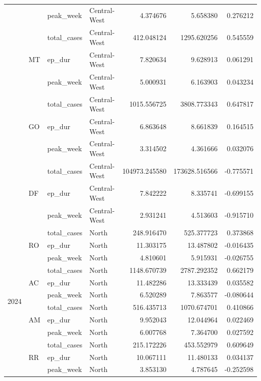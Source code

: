 \documentclass{report}
\begin{document}
\begin{center}
\begin{center}
\begin{longtable}{llllrrr}
 &  & peak\_week & Central-West & 4.374676 & 5.658380 & 0.276212 \\
\cline{2-7}
 & \multirow[t]{3}{*}{MT} & total\_cases & Central-West & 412.048124 & 1295.620256 & 0.545559 \\
 &  & ep\_dur & Central-West & 7.820634 & 9.628913 & 0.061291 \\
 &  & peak\_week & Central-West & 5.000931 & 6.163903 & 0.043234 \\
\cline{2-7}
 & \multirow[t]{3}{*}{GO} & total\_cases & Central-West & 1015.556725 & 3808.773343 & 0.647817 \\
 &  & ep\_dur & Central-West & 6.863648 & 8.661839 & 0.164515 \\
 &  & peak\_week & Central-West & 3.314502 & 4.361666 & 0.032076 \\
\cline{2-7}
 & \multirow[t]{3}{*}{DF} & total\_cases & Central-West & 104973.245580 & 173628.516566 & -0.775571 \\
 &  & ep\_dur & Central-West & 7.842222 & 8.335741 & -0.699155 \\
 &  & peak\_week & Central-West & 2.931241 & 4.513603 & -0.915710 \\
\cline{1-7} \cline{2-7}
\multirow[t]{81}{*}{2024} & \multirow[t]{3}{*}{RO} & total\_cases & North & 248.916470 & 525.377723 & 0.373868 \\
 &  & ep\_dur & North & 11.303175 & 13.487802 & -0.016435 \\
 &  & peak\_week & North & 4.810601 & 5.915931 & -0.026755 \\
\cline{2-7}
 & \multirow[t]{3}{*}{AC} & total\_cases & North & 1148.670739 & 2787.292352 & 0.662179 \\
 &  & ep\_dur & North & 11.482286 & 13.333439 & 0.035582 \\
 &  & peak\_week & North & 6.520289 & 7.863577 & -0.080644 \\
\cline{2-7}
 & \multirow[t]{3}{*}{AM} & total\_cases & North & 516.435713 & 1070.674701 & 0.410866 \\
 &  & ep\_dur & North & 9.952043 & 12.044964 & 0.022469 \\
 &  & peak\_week & North & 6.007768 & 7.364700 & 0.027592 \\
\cline{2-7}
 & \multirow[t]{3}{*}{RR} & total\_cases & North & 215.172226 & 453.552979 & 0.609649 \\
 &  & ep\_dur & North & 10.067111 & 11.480133 & 0.034137 \\
 &  & peak\_week & North & 3.853130 & 4.787645 & -0.252598 \\

\end{longtable}
\end{center}
\end{center}
\end{document}
